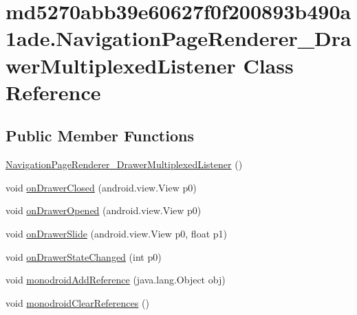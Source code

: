 \hypertarget{classmd5270abb39e60627f0f200893b490a1ade_1_1_navigation_page_renderer___drawer_multiplexed_listener}{
\section{md5270abb39e60627f0f200893b490a1ade.NavigationPageRenderer\_\-DrawerMultiplexedListener Class Reference}
\label{classmd5270abb39e60627f0f200893b490a1ade_1_1_navigation_page_renderer___drawer_multiplexed_listener}
}
\subsection*{Public Member Functions}
\begin{CompactItemize}
\item 
\hyperlink{classmd5270abb39e60627f0f200893b490a1ade_1_1_navigation_page_renderer___drawer_multiplexed_listener_a407a22b5a4d58a5b0304d215a593b16}{NavigationPageRenderer\_\-DrawerMultiplexedListener} ()
\item 
void \hyperlink{classmd5270abb39e60627f0f200893b490a1ade_1_1_navigation_page_renderer___drawer_multiplexed_listener_e7797475318052fa5f320530ebca7a10}{onDrawerClosed} (android.view.View p0)
\item 
void \hyperlink{classmd5270abb39e60627f0f200893b490a1ade_1_1_navigation_page_renderer___drawer_multiplexed_listener_f85aa354f7840a0eb87f0813d2627c53}{onDrawerOpened} (android.view.View p0)
\item 
void \hyperlink{classmd5270abb39e60627f0f200893b490a1ade_1_1_navigation_page_renderer___drawer_multiplexed_listener_b6ea42b5a794f8cf87b945e4fbdf30fc}{onDrawerSlide} (android.view.View p0, float p1)
\item 
void \hyperlink{classmd5270abb39e60627f0f200893b490a1ade_1_1_navigation_page_renderer___drawer_multiplexed_listener_d1ba0dec7dcc4e37e074f4240e9a8d94}{onDrawerStateChanged} (int p0)
\item 
void \hyperlink{classmd5270abb39e60627f0f200893b490a1ade_1_1_navigation_page_renderer___drawer_multiplexed_listener_9fe3ad6372535488cabdac044c3187e2}{monodroidAddReference} (java.lang.Object obj)
\item 
void \hyperlink{classmd5270abb39e60627f0f200893b490a1ade_1_1_navigation_page_renderer___drawer_multiplexed_listener_0cdb1460e8a947f244c618526c334c0c}{monodroidClearReferences} ()
\end{CompactItemize}
